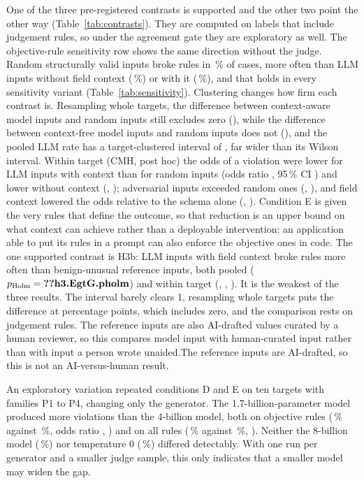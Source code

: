 \documentclass[conference]{IEEEtran}
\begin{document}
One of the three pre-registered contrasts is supported and the other two point the other way
(Table~\ref{tab:contrasts}).\ifjudgeweak{} They are computed on labels that include judgement rules, so under the
agreement gate they are exploratory as well. The objective-rule sensitivity row shows the same
direction without the judge.\fi{} Random structurally valid inputs broke rules in \,\% of
cases, more often than LLM inputs without field context (\,\%) or with it
(\,\%), and that holds in every sensitivity variant (Table~\ref{tab:sensitivity}).
Clustering changes how firm each contrast is. Resampling whole targets, the difference between
context-aware model inputs and random inputs still excludes zero (), while the
difference between context-free model inputs and random inputs does not (), and
the pooled LLM rate has a target-clustered interval of , far wider than its Wilson
interval. Within
target (CMH, post hoc) the odds of a violation were lower for LLM inputs with context than for random
inputs (odds ratio , 95\,\% CI ) and lower without context
(, ); adversarial inputs exceeded random ones (,
), and field context lowered the odds relative to the schema alone (,
). Condition E is given the very rules that define the outcome, so that reduction is an
upper bound on what context can achieve rather than a deployable intervention: an application able to
put its rules in a prompt can also enforce the objective ones in code. The one supported contrast is H3b: LLM inputs with field context broke rules more often than
benign-unusual reference inputs, both pooled ($p_{\mathrm{Holm}}=\R{h3.EgtG.pholm}$) and within target
(, , ). It is the weakest of the three results. The interval
barely clears 1, resampling whole targets puts the difference at  percentage points,
which includes zero, and the comparison rests on judgement rules. \ifreviewed The reference
inputs are also AI-drafted values curated by a human reviewer, so this compares model input with
human-curated input rather than with input a person wrote unaided.\else The reference inputs are
AI-drafted, so this is not an AI-versus-human result.\fi{}

An exploratory variation repeated conditions D and E on ten targets with families P1 to P4, changing
only the generator. The 1.7-billion-parameter model produced more violations than
the 4-billion model, both on objective rules (\,\% against \,\%, odds
ratio , ) and on all rules (\,\% against
\,\%, ). Neither the 8-billion model (\,\%) nor
temperature 0 (\,\%) differed detectably. With one run per generator and a smaller
judge sample, this only indicates that a smaller model may widen the gap.
\end{document}

